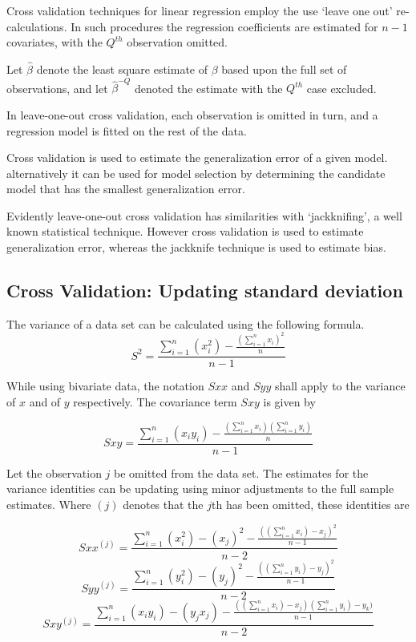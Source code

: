\documentclass[12pt, a4paper]{report}
\theoremstyle{plain}
\theoremstyle{definition}
\theoremstyle{remark}
\begin{document}
Cross validation techniques for linear regression employ the use `leave one out' re-calculations. In such procedures the regression coefficients are estimated for $n-1$ covariates, with the $Q^{th}$ observation omitted.

Let $\hat{\beta}$ denote the least square estimate of $\beta$ based upon the full set of observations, and let
$\hat{\beta}^{-Q}$ denoted the estimate with the $Q^{th}$ case
excluded.


In leave-one-out cross validation, each observation is omitted in
turn, and a regression model is fitted on the rest of the data.

Cross validation is used to estimate the generalization error of a
given model. alternatively it can be used for model selection by
determining the candidate model that has the smallest
generalization error.


Evidently leave-one-out cross validation has similarities with
`jackknifing', a well known statistical technique. However cross
validation is used to estimate generalization error, whereas the
jackknife technique is used to estimate bias.

\subsection{Cross Validation: Updating standard deviation}

The variance of a data set can be calculated using the following
formula.
\begin{equation}
S^{2}=\frac{\sum_{i=1}^{n}(x_{i}^{2})-\frac{(\sum_{i=1}^{n}x_{i})^{2}}{n}}{n-1}
\end{equation}

While using bivariate data, the notation $Sxx$ and $Syy$ shall
apply to the variance of $x$ and of $y$ respectively. The
covariance term $Sxy$ is given by

\begin{equation}
Sxy=\frac{\sum_{i=1}^{n}(x_{i}y_{i})-\frac{(\sum_{i=1}^{n}x_{i})(\sum_{i=1}^{n}y_{i})}{n}}{n-1}
\end{equation}

Let the observation $j$ be omitted from the data set. The
estimates for the variance identities can be updating using minor
adjustments to the full sample estimates. Where $(j)$ denotes that
the $j$th has been omitted, these identities are

\begin{equation}
Sxx^{(j)}=\frac{\sum_{i=1}^{n}(x_{i}^{2})-(x_{j})^{2}-\frac{((\sum_{i=1}^{n}x_{i})-x_{j})^{2}}{n-1}}{n-2}
\end{equation}
\begin{equation}
Syy^{(j)}=\frac{\sum_{i=1}^{n}(y_{i}^{2})-(y_{j})^{2}-\frac{((\sum_{i=1}^{n}y_{i})-y_{j})^{2}}{n-1}}{n-2}
\end{equation}
\begin{equation}
Sxy^{(j)}=\frac{\sum_{i=1}^{n}(x_{i}y_{i})-(y_{j}x_{j})-\frac{((\sum_{i=1}^{n}x_{i})-x_{j})(\sum_{i=1}^{n}y_{i})-y_{k})}{n-1}}{n-2}
\end{equation}
\end{document}
